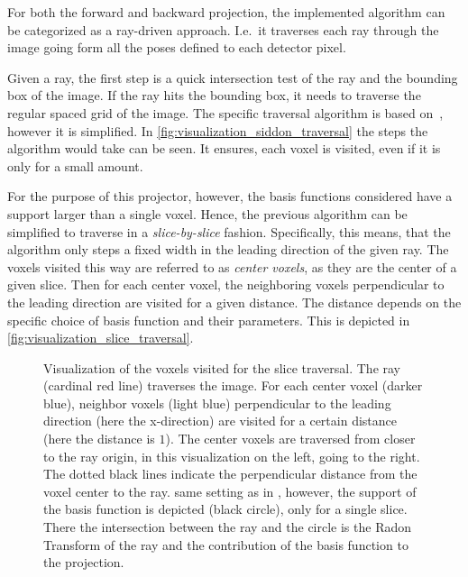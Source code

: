 For both the forward and backward projection, the implemented algorithm can be categorized as a
ray-driven approach. I.e.\ it traverses each ray through the image going form all the poses defined
to each detector pixel.

Given a ray, the first step is a quick intersection test of the ray and the bounding box of the
image. If the ray hits the bounding box, it needs to traverse the regular spaced grid of the image.
The specific traversal algorithm is based on~\cite{amanatides_fast_1987}, however it is simplified.
In \autoref{fig:visualization_siddon_traversal} the steps the algorithm would take can be seen. It
ensures, each voxel is visited, even if it is only for a small amount.

For the purpose of this projector, however, the basis functions considered have a support larger
than a single voxel. Hence, the previous algorithm can be simplified to traverse in a
\textit{slice-by-slice} fashion. Specifically, this means, that the algorithm only steps a fixed
width in the leading direction of the given ray. The voxels visited this way are referred to as
\textit{center voxels}, as they are the center of a given slice. Then for each center voxel, the
neighboring voxels perpendicular to the leading direction are visited for a given distance. The
distance depends on the specific choice of basis function and their parameters. This is depicted in
\autoref{fig:visualization_slice_traversal}.

\begin{figure}[h]
	\centering
	\caption{ Visualization of the voxels visited
		for the slice traversal. The ray (cardinal red line) traverses the image. For each
		center voxel (darker blue), neighbor voxels (light blue) perpendicular to the
		leading direction (here the x-direction) are visited for a certain distance (here
		the distance is \(1\)). The center voxels are traversed from closer to the ray
		origin, in this visualization on the left, going to the right. The dotted black
		lines indicate the perpendicular distance from the voxel center to the ray.
		 same setting as in
		, however, the support of the basis function is
		depicted (black circle), only for a single slice. There the intersection between the
		ray and the circle is the Radon Transform of the ray and the contribution of the
		basis function to the projection.
	}\label{fig:visualization_slice_traversal}
\end{figure}

